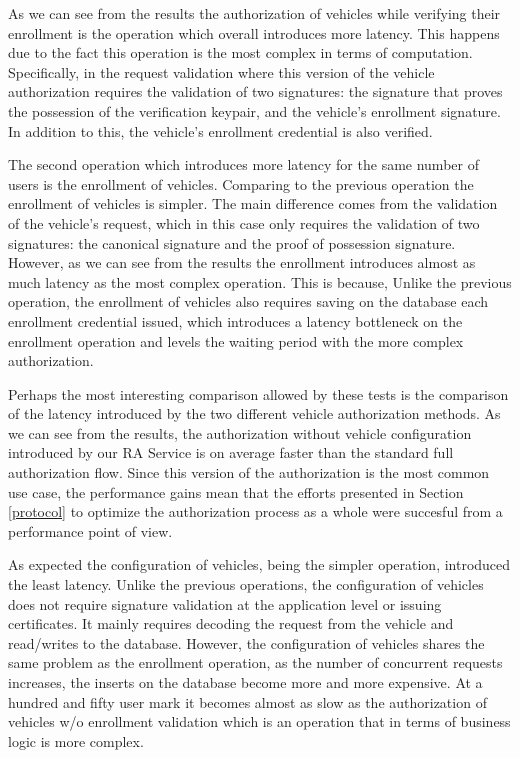 As we can see from the results the authorization of vehicles while verifying their enrollment is the operation which overall introduces more latency. This happens due to the fact this operation is the most complex in terms of computation. Specifically, in the request validation where this version of the vehicle authorization requires the validation of two signatures: the signature that proves the possession of the verification keypair, and the vehicle's enrollment signature. In addition to this, the vehicle's enrollment credential is also verified.

The second operation which introduces more latency for the same number of users is the enrollment of vehicles. Comparing to the previous operation the enrollment of vehicles is simpler. The main difference comes from the validation of the vehicle's request, which in this case only requires the validation of two signatures: the canonical signature and the proof of possession signature. However, as we can see from the results the enrollment introduces almost as much latency as the most complex operation. This is because, Unlike the previous operation, the enrollment of vehicles also requires saving on the database each enrollment credential issued, which introduces a latency bottleneck on the enrollment operation and levels the waiting period with the more complex authorization.

Perhaps the most interesting comparison allowed by these tests is the comparison of the latency introduced by the two different vehicle authorization methods. As we can see from the results, the authorization without vehicle configuration introduced by our RA Service is on average faster than the standard full authorization flow. Since this version of the authorization is the most common use case, the performance gains mean that the efforts presented in Section \ref{protocol} to optimize the authorization process as a whole were succesful from a performance point of view. 

As expected the configuration of vehicles, being the simpler operation, introduced the least latency. Unlike the previous operations, the configuration of vehicles does not require signature validation at the application level or issuing certificates. It mainly requires decoding the request from the vehicle and read/writes to the database. However, the configuration of vehicles shares the same problem as the enrollment operation, as the number of concurrent requests increases, the inserts on the database become more and more expensive. At a hundred and fifty user mark it becomes almost as slow as the authorization of vehicles w/o enrollment validation which is an operation that in terms of business logic is more complex. 

